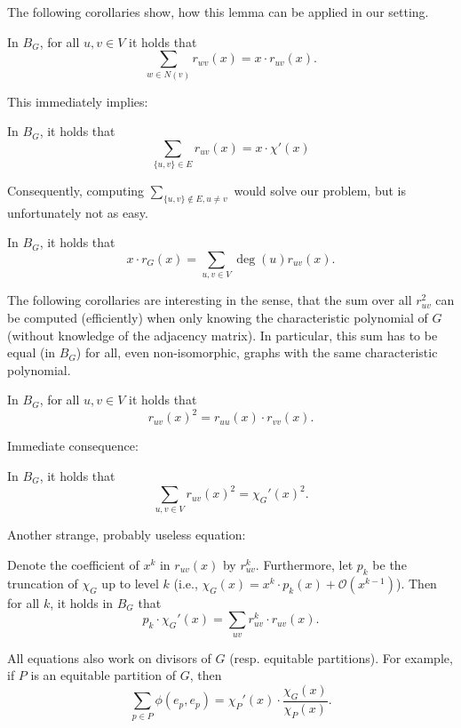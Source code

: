 \documentclass[a4paper,12pt]{article}
\begin{document}
The following corollaries show, how this lemma can be applied in our setting.

\begin{cor}
In $B_G$, for all $u,v\in V$ it holds that
$$
\sum_{w\in N(v)}r_{wv}(x) = x \cdot r_{uv}(x).
$$
\end{cor}
This immediately implies:
\begin{cor}
In $B_G$, it holds that
$$
\sum_{\{u,v\}\in E}r_{uv}(x) = x\cdot\chi'(x)
$$
\end{cor}

Consequently, computing $\sum_{\{u,v\}\notin E, u \neq v}$ would solve our problem, but is unfortunately not as easy.

\begin{cor}
In $B_G$, it holds that
$$
x \cdot r_G(x) = \sum_{u,v \in V} \deg(u)r_{uv}(x).
$$
\end{cor}

The following corollaries are interesting in the sense, that the sum over all $r_{uv}^2$ can be computed (efficiently) when only knowing the characteristic polynomial of $G$ (without knowledge of the adjacency matrix). In particular, this sum has to be equal (in $B_G$) for all, even non-isomorphic, graphs with the same characteristic polynomial.

\begin{cor}
In $B_G$, for all $u,v \in V$ it holds that
$$
r_{uv}(x)^2 = r_{uu}(x) \cdot r_{vv}(x).
$$
\end{cor}

Immediate consequence:

\begin{cor}
In $B_G$, it holds that
$$
\sum_{u,v\in V}r_{uv}(x)^2 = \chi_G'(x)^2.
$$
\end{cor}

Another strange, probably useless equation:

\begin{cor}
Denote the coefficient of $x^k$ in $r_{uv}(x)$ by $r_{uv}^k$. Furthermore, let $p_k$ be the truncation of $\chi_G$ up to level $k$ (i.e., $\chi_G(x) = x^k \cdot p_k(x) + \mathcal{O}(x^{k-1})$). Then for all $k$, it holds in $B_G$ that
$$
p_k \cdot \chi_G'(x) = \sum_{uv}r_{uv}^k \cdot r_{uv}(x).
$$
\end{cor}

\begin{remark}
All equations also work on divisors of $G$ (resp. equitable partitions). For example, if $P$ is an equitable partition of $G$, then
$$
\sum_{p\in P}\phi(e_p,e_p) = \chi_P'(x) \cdot \frac{\chi_G(x)}{\chi_P(x)}.
$$
\end{remark}
\end{document}
